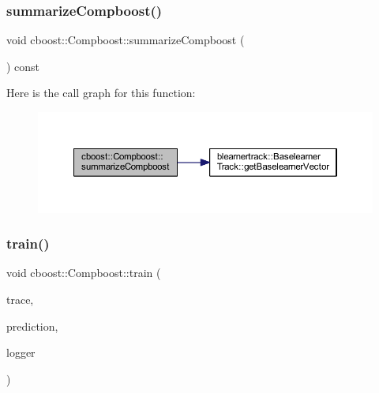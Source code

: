 \subsubsection{\texorpdfstring{summarize\+Compboost()}{summarizeCompboost()}}
{\footnotesize\ttfamily void cboost\+::\+Compboost\+::summarize\+Compboost (\begin{DoxyParamCaption}{ }\end{DoxyParamCaption}) const}

Here is the call graph for this function\+:\nopagebreak
\begin{figure}[H]
\begin{center}
\leavevmode
\includegraphics[width=350pt]{classcboost_1_1_compboost_a7be8cb767054ece895d535c1f468233e_cgraph}
\end{center}
\end{figure}
\mbox{\label{classcboost_1_1_compboost_aa898572eb2c83e0b95c12788a859333b}} 
\subsubsection{\texorpdfstring{train()}{train()}}
{\footnotesize\ttfamily void cboost\+::\+Compboost\+::train (\begin{DoxyParamCaption}\item[{const bool \&}]{trace,  }\item[{const arma\+::vec \&}]{prediction,  }\item[{\mbox{\hyperlink{classloggerlist_1_1_logger_list}{loggerlist\+::\+Logger\+List}} $\ast$}]{logger }\end{DoxyParamCaption})}


